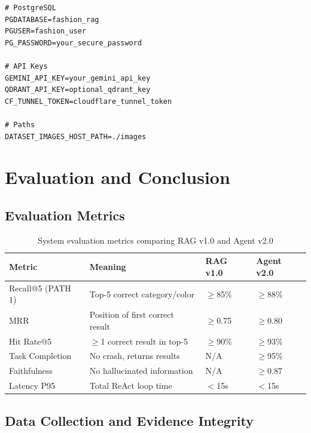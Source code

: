 \documentclass[12pt, twoside]{report}
\begin{document}
\begin{lstlisting}[caption={Environment variables (.env)}]
# PostgreSQL
PGDATABASE=fashion_rag
PGUSER=fashion_user
PG_PASSWORD=your_secure_password

# API Keys
GEMINI_API_KEY=your_gemini_api_key
QDRANT_API_KEY=optional_qdrant_key
CF_TUNNEL_TOKEN=cloudflare_tunnel_token

# Paths
DATASET_IMAGES_HOST_PATH=./images
\end{lstlisting}

\chapter{Evaluation and Conclusion}

\section{Evaluation Metrics}

\begin{table}[H]
\centering
\begin{tabular}{llll}
\toprule
\textbf{Metric} & \textbf{Meaning} & \textbf{RAG v1.0} & \textbf{Agent v2.0}\\
\midrule
Recall@5 (PATH 1)   & Top-5 correct category/color   & $\geq$85\% & $\geq$88\%\\
MRR                 & Position of first correct result & $\geq$0.75 & $\geq$0.80\\
Hit Rate@5          & $\geq$1 correct result in top-5 & $\geq$90\% & $\geq$93\%\\
Task Completion     & No crash, returns results       & N/A         & $\geq$95\%\\
Faithfulness        & No hallucinated information     & N/A         & $\geq$0.87\\
Latency P95         & Total ReAct loop time           & $<$15s      & $<$15s\\
\bottomrule
\end{tabular}
\caption{System evaluation metrics comparing RAG v1.0 and Agent v2.0}
\end{table}

\section{Data Collection and Evidence Integrity}
\label{sec:data_evidence_integrity}
\end{document}

